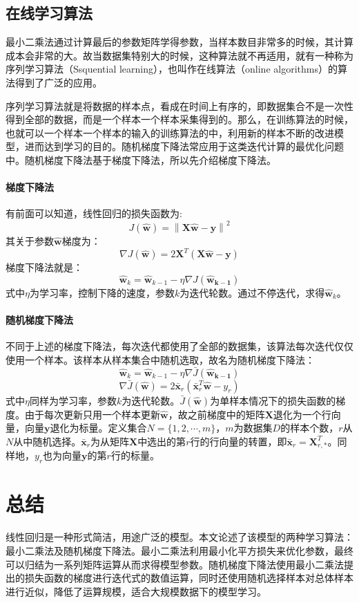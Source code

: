 \documentclass[12pt,a4paper,draft]{ctexart}
\begin{document}
\subsection{在线学习算法}
最小二乘法通过计算最后的参数矩阵学得参数，当样本数目非常多的时候，其计算成本会非常的大。故当数据集特别大的时候，这种算法就不再适用，就有一种称为序列学习算法（Ssquential learning），也叫作在线算法（online algorithms）的算法得到了广泛的应用。

序列学习算法就是将数据的样本点，看成在时间上有序的，即数据集合不是一次性得到全部的数据，而是一个样本一个样本采集得到的。那么，在训练算法的时候，也就可以一个样本一个样本的输入的训练算法的中，利用新的样本不断的改进模型，进而达到学习的目的。随机梯度下降法常应用于这类迭代计算的最优化问题中。随机梯度下降法基于梯度下降法，所以先介绍梯度下降法。

\paragraph{梯度下降法}
有前面可以知道，线性回归的损失函数为:
\[ J(\mathbf{\hat{w}})=\left \| \mathbf{X}\mathbf{\hat{w}}-\mathbf{y} \right \|^{2} \]
其关于参数$ \mathbf{\hat{w}} $梯度为：
\[ \nabla J(\mathbf{\hat{w}})=2\textbf{X}^T(\textbf{X}\hat{\textbf{w}}-\textbf{y}) \]
梯度下降法就是：
\[ \mathbf{\hat{w}}_{k} = \mathbf{\hat{w}}_{k-1}- \eta \nabla J(\mathbf{\hat{w}_{k-1}}) \]
式中$\eta$为学习率，控制下降的速度，参数$ k $为迭代轮数。通过不停迭代，求得$ \mathbf{\hat{w}}_{k} $。
\paragraph{随机梯度下降法}
不同于上述的梯度下降法，每次迭代都使用了全部的数据集，该算法每次迭代仅仅使用一个样本。该样本从样本集合中随机选取，故名为随机梯度下降法：
\[\mathbf{\hat{w}}_{k} = \mathbf{\hat{w}}_{k-1}- \eta \nabla\bar{J}(\mathbf{\hat{w}_{k-1}})\]  
\[\nabla\bar{J}(\mathbf{\hat{w}})=2 \bar{\textbf{x}}_{r}(\bar{\textbf{x}}_{r}^T\mathbf{\hat{w}} - y_{r}) \] 
式中$\eta$同样为学习率，参数$ k $为迭代轮数。$ \bar{J}(\mathbf{\hat{w}}) $为单样本情况下的损失函数的梯度。由于每次更新只用一个样本更新$ \mathbf{\hat{w}} $，故之前梯度中的矩阵$ \textbf{X} $退化为一个行向量，向量$ \textbf{y} $退化为标量。定义集合$ N=\{1,2,\cdots,m\} $，$ m $为数据集$ D $的样本个数，$ r $从$ N $从中随机选择。$ \bar{\textbf{x}}_{r} $为从矩阵$ \textbf{X} $中选出的第$ r $行的行向量的转置，即$ \bar{\textbf{x}}_{r}=\textbf{X}_{r,*}^T $。同样地，$ y_{r} $也为向量$ \textbf{y} $的第$ r $行的标量。
\section{总结}
线性回归是一种形式简洁，用途广泛的模型。本文论述了该模型的两种学习算法：最小二乘法及随机梯度下降法。最小二乘法利用最小化平方损失来优化参数，最终可以归结为一系列矩阵运算从而求得模型参数。随机梯度下降法使用最小二乘法提出的损失函数的梯度进行迭代式的数值运算，同时还使用随机选择样本对总体样本进行近似，降低了运算规模，适合大规模数据下的模型学习。
\end{document}
